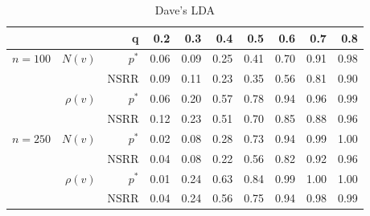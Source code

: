 \documentclass{article}
\begin{document}
\begin{table}[ht]
\begin{center}
\begin{tabular}{|r|r|r|rrrrrrr|}
  \hline
& & q & 0.2 & 0.3 & 0.4 & 0.5 & 0.6 & 0.7 & 0.8 \\ 
  \hline
\multirow{4}{*}{$n = 100$} & \multirow{2}{*}{$N(v)$} & $p^{*}$ & 0.06 & 0.09 & 0.25 & 0.41 & 0.70 & 0.91 & 0.98 \\ 
  & & NSRR & 0.09 & 0.11 & 0.23 & 0.35 & 0.56 & 0.81 & 0.90 \\
  \cline{2-10} 
  & \multirow{2}{*}{$\rho(v)$} & $p^{*}$ & 0.06 & 0.20 & 0.57 & 0.78 & 0.94 & 0.96 & 0.99 \\ 
  & & NSRR & 0.12 & 0.23 & 0.51 & 0.70 & 0.85 & 0.88 & 0.96 \\ \hline
  \multirow{4}{*}{$n = 250$} & \multirow{2}{*}{$N(v)$} & $p^{*}$ & 0.02 & 0.08 & 0.28 & 0.73 & 0.94 & 0.99 & 1.00 \\ 
  & & NSRR & 0.04 & 0.08 & 0.22 & 0.56 & 0.82 & 0.92 & 0.96 \\ \cline{2-10}
  & \multirow{2}{*}{$\rho(v)$} & $p^{*}$ & 0.01 & 0.24 & 0.63 & 0.84 & 0.99 & 1.00 & 1.00 \\ 
  & & NSRR & 0.04 & 0.24 & 0.56 & 0.75 & 0.94 & 0.98 & 0.99 \\ 
   \hline
\end{tabular}
\caption{Dave's LDA}
\end{center}
\end{table}
\end{document}
